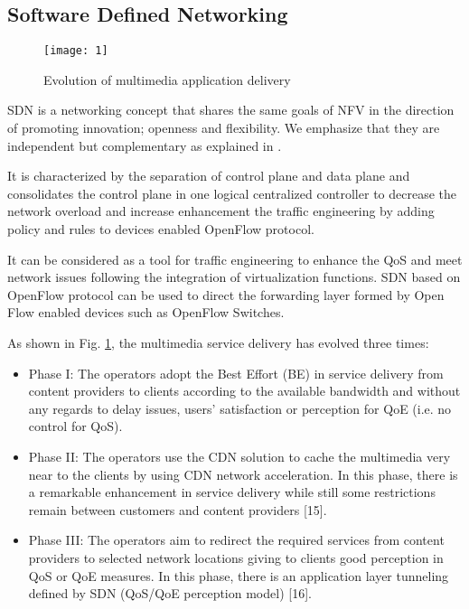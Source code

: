 \documentclass[letterpaper,conference]{IEEEtran}
\begin{document}
\subsection{Software Defined Networking}

\begin{figure}[t]
\centering
\texttt{[image: 1]}
\caption{Evolution of multimedia application delivery}
\label{1}
\end{figure}

SDN \cite{[5]} is a networking concept that shares the same goals of NFV in the direction of promoting innovation; openness and flexibility. We emphasize that they are independent but complementary as explained in \cite{[6]}.

It is characterized by the separation of control plane and
data plane and consolidates the control plane in one logical
centralized controller to decrease the network overload and
increase enhancement the traffic engineering by adding policy and rules to devices enabled OpenFlow protocol.

It can be considered as a tool for traffic engineering to
enhance the QoS and meet network issues following the
integration of virtualization functions. SDN based on
OpenFlow protocol can be used to direct the forwarding layer
formed by Open Flow enabled devices such as OpenFlow
Switches.

As shown in Fig. \ref{1}, the multimedia service delivery has
evolved three times:
\begin{itemize}
\item Phase I: The operators adopt the Best Effort (BE) in service delivery from content providers to clients according to the available bandwidth and without any regards to delay issues, users’ satisfaction or perception for QoE (i.e. no control for QoS).
\item Phase II: The operators use the CDN solution to cache the
multimedia very near to the clients by using CDN network
acceleration. In this phase, there is a remarkable enhancement
in service delivery while still some restrictions remain
between customers and content providers [15].
\item Phase III: The operators aim to redirect the required services from content providers to selected network locations giving to clients good perception in QoS or QoE measures. In this phase, there is an application layer tunneling defined by SDN (QoS/QoE perception model) [16].
\end{itemize}
\end{document}
